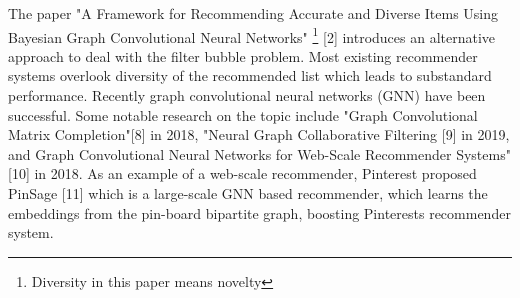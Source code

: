 The paper "A Framework for Recommending Accurate and Diverse Items  Using Bayesian Graph Convolutional Neural Networks" \footnote {Diversity in this paper means novelty} [2] introduces an alternative approach to deal with the filter bubble problem. Most existing recommender systems overlook diversity of the recommended list which leads to substandard performance. 
Recently graph convolutional neural networks (GNN) have been successful. Some notable research on the topic include "Graph Convolutional Matrix Completion"[8] in 2018, "Neural Graph Collaborative Filtering [9] in 2019, and Graph Convolutional Neural Networks for Web-Scale Recommender Systems" [10] in 2018. As an example of a web-scale recommender, Pinterest proposed PinSage [11] which is a large-scale GNN based recommender, which learns the embeddings from the pin-board bipartite graph, boosting Pinterests recommender system.

